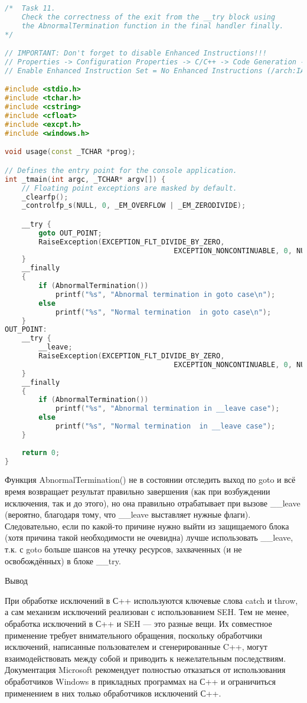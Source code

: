 \documentclass[a4paper,12pt]{article} %
\begin{document}
\begin{lstlisting}[language=C++, caption={Проверка корректности выхода из блока \_\_try}]
/*  Task 11.
	Check the correctness of the exit from the __try block using
	the AbnormalTermination function in the final handler finally.
*/

// IMPORTANT: Don't forget to disable Enhanced Instructions!!!
// Properties -> Configuration Properties -> C/C++ -> Code Generation ->
// Enable Enhanced Instruction Set = No Enhanced Instructions (/arch:IA32)

#include <stdio.h>
#include <tchar.h>
#include <cstring>
#include <cfloat>
#include <excpt.h>
#include <windows.h>

void usage(const _TCHAR *prog);

// Defines the entry point for the console application.
int _tmain(int argc, _TCHAR* argv[]) {
	// Floating point exceptions are masked by default.
	_clearfp();
	_controlfp_s(NULL, 0, _EM_OVERFLOW | _EM_ZERODIVIDE);

	__try {
		goto OUT_POINT;
		RaiseException(EXCEPTION_FLT_DIVIDE_BY_ZERO,
										EXCEPTION_NONCONTINUABLE, 0, NULL);
	}
	__finally
	{
		if (AbnormalTermination())
			printf("%s", "Abnormal termination in goto case\n");
		else
			printf("%s", "Normal termination  in goto case\n");
	}
OUT_POINT:
	__try {
		__leave;
		RaiseException(EXCEPTION_FLT_DIVIDE_BY_ZERO,
										EXCEPTION_NONCONTINUABLE, 0, NULL);
	}
	__finally
	{
		if (AbnormalTermination())
			printf("%s", "Abnormal termination in __leave case");
		else
			printf("%s", "Normal termination  in __leave case");
	}
	
	return 0;
}
\end{lstlisting}

Функция AbnormalTermination() не в состоянии отследить выход по goto и всё время возвращает результат правильно завершения (как при возбуждении исключения, так и до этого), но она правильно отрабатывает при вызове \_\_leave (вероятно, благодаря тому, что \_\_leave выставляет нужные флаги). Следовательно, если по какой-то причине нужно выйти из защищаемого блока (хотя причина такой необходимости не очевидна) лучше использовать \_\_leave, т.к. с goto больше шансов на утечку ресурсов, захваченных (и не освобождённых) в блоке \_\_try.
\newpage


Вывод

\vspace{3em}
При обработке исключений в С++ используются ключевые слова catch и throw, а сам механизм исключений реализован с использованием SEH. Тем не менее, обработка исключений в С++ и SEH — это разные вещи. Их совместное применение требует внимательного обращения, поскольку обработчики исключений, написанные пользователем и сгенерированные C++, могут взаимодействовать между собой и приводить к нежелательным последствиям. Документация Microsoft рекомендует полностью отказаться от использования обработчиков Windows в прикладных программах на С++ и ограничиться применением в них только обработчиков исключений С++.
\end{document}
